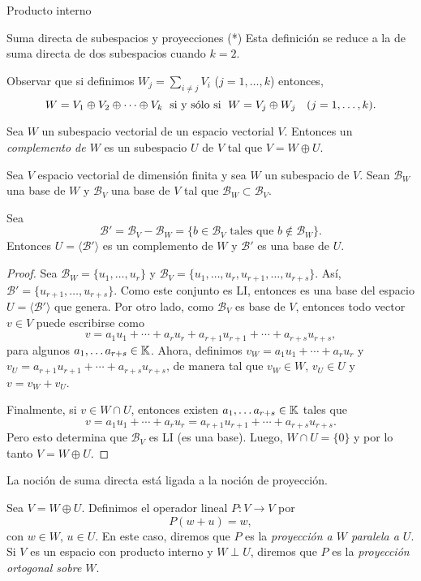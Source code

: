 \begin{chapter}{Producto interno}
\begin{section}{Suma directa de subespacios y proyecciones  (*)}
		Esta definición se reduce  a la de suma directa de dos subespacios cuando $k=2$.
		
		Observar que si definimos $W_j = \sum_{i \ne j}V_i$ ($j=1,\ldots,k$) entonces, 
		$$W = V_1 \oplus V_2 \oplus \cdots \oplus V_k \;\text{ si y sólo si }\;W = V_j \oplus W_j\text{ \; }(j=1,\ldots,k).
		$$
		
        \begin{definicion} Sea $W$  un subespacio vectorial de un espacio vectorial $V$. Entonces un \textit{complemento de $W$} es un subespacio $U$ de $V$ tal que $V=W\oplus U$. 
		\end{definicion}
		
		\begin{proposicion} Sea $V$  espacio vectorial de dimensión finita y sea $W$ un subespacio de  $V$. Sean $\mathcal{B}_W$ una base de $W$ y $\mathcal{B}_V$ una base de $V$ tal que $\mathcal{B}_W\subset \mathcal{B}_V$. 
			
			Sea 
			\[
			\mathcal{B}'=\mathcal{B}_V -\mathcal{B}_W=\{b\in\mathcal{B}_V \text{ tales que } b\notin\mathcal{B}_W \}.
			\]  
			Entonces $U=\langle 	\mathcal{B}'\rangle$ es un complemento de $W$ y $\mathcal{B}'$ es una base de $U$.
		\end{proposicion}
		\begin{proof}
			Sea $\mathcal{B}_W = \{u_1,\ldots,u_r \}$ y $\mathcal{B}_V = \{u_1,\ldots,u_r, u_{r+1},\ldots,u_{r+s}\}$. Así, 	$\mathcal{B}'=\{u_{r+1},\ldots,u_{r+s} \}$. Como este conjunto es LI, entonces es una base del espacio $U=\langle 	\mathcal{B}'\rangle$ que genera. Por otro lado, como $\mathcal{B}_V$ es base de $V$, entonces todo vector $v\in V$ puede escribirse como
			\[
			v=a_1u_1+\cdots+a_ru_r + a_{r+1}u_{r+1}+\cdots+a_{r+s}u_{r+s},
			\]
			para algunos $a_1,\dots a_{r+s}\in \mathbb K$.				
			Ahora, definimos $v_W=a_1u_1+\cdots+a_ru_r$ y $v_U=a_{r+1}u_{r+1}+\cdots+a_{r+s}u_{r+s}$, de manera tal que  $v_W\in W$, $v_U\in U$ y $v=v_W+v_U$.
			
			Finalmente, si $v\in W\cap U$, entonces existen $a_1,\dots a_{r+s}\in \mathbb K$ tales que 
			\[
			v=a_1u_1+\cdots+a_ru_r = a_{r+1}u_{r+1}+\cdots+a_{r+s}u_{r+s}.
			\]
			Pero esto determina que $\mathcal{B}_V$ es LI (es una base). Luego, $W\cap U=\{0\}$ y por lo tanto $V=W\oplus U$.
		\end{proof}
		
		La noción de suma directa está ligada a la noción de proyección.
		
        \begin{definicion} Sea $V = W \oplus U$. Definimos el operador lineal $P: V \to V$ por  $$P(w+u) = w,$$ con $w \in W$, $u\in U$. En este caso, diremos que $P$ es la \textit{proyección a $W$ paralela a $U$}. Si $V$  es un espacio con producto interno y  $W \perp U$, diremos que $P$ es la \textit{proyección ortogonal sobre $W$}. 
		\end{definicion}
		

\end{section}
\end{chapter}
